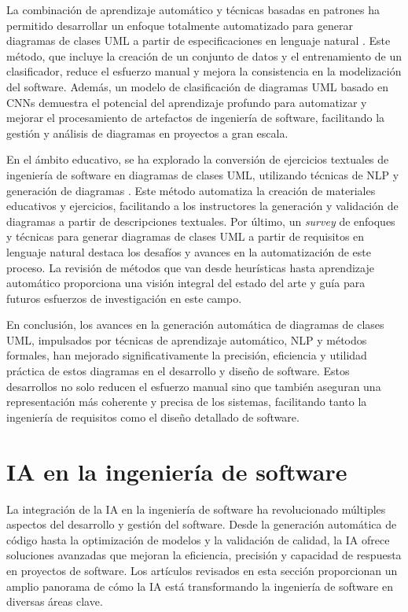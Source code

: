 La combinación de aprendizaje automático y técnicas basadas en patrones ha permitido desarrollar un enfoque totalmente automatizado para generar diagramas de clases UML a partir de especificaciones en lenguaje natural \cite{Milanova2005}. Este método, que incluye la creación de un conjunto de datos y el entrenamiento de un clasificador, reduce el esfuerzo manual y mejora la consistencia en la modelización del software. Además, un modelo de clasificación de diagramas UML basado en CNNs \cite{Yang2022} demuestra el potencial del aprendizaje profundo para automatizar y mejorar el procesamiento de artefactos de ingeniería de software, facilitando la gestión y análisis de diagramas en proyectos a gran escala.

En el ámbito educativo, se ha explorado la conversión de ejercicios textuales de ingeniería de software en diagramas de clases UML, utilizando técnicas de NLP y generación de diagramas \cite{Wang2022}. Este método automatiza la creación de materiales educativos y ejercicios, facilitando a los instructores la generación y validación de diagramas a partir de descripciones textuales. Por último, un \textit{survey} de enfoques y técnicas para generar diagramas de clases UML a partir de requisitos en lenguaje natural \cite{Abdelnabi2021} destaca los desafíos y avances en la automatización de este proceso. La revisión de métodos que van desde heurísticas hasta aprendizaje automático proporciona una visión integral del estado del arte y guía para futuros esfuerzos de investigación en este campo.


En conclusión, los avances en la generación automática de diagramas de clases UML, impulsados por técnicas de aprendizaje automático, NLP y métodos formales, han mejorado significativamente la precisión, eficiencia y utilidad práctica de estos diagramas en el desarrollo y diseño de software. Estos desarrollos no solo reducen el esfuerzo manual sino que también aseguran una representación más coherente y precisa de los sistemas, facilitando tanto la ingeniería de requisitos como el diseño detallado de software.

\section{IA en la ingeniería de software}

La integración de la IA en la ingeniería de software ha revolucionado múltiples aspectos del desarrollo y gestión del software. Desde la generación automática de código hasta la optimización de modelos y la validación de calidad, la IA ofrece soluciones avanzadas que mejoran la eficiencia, precisión y capacidad de respuesta en proyectos de software. Los artículos revisados en esta sección proporcionan un amplio panorama de cómo la IA está transformando la ingeniería de software en diversas áreas clave.

